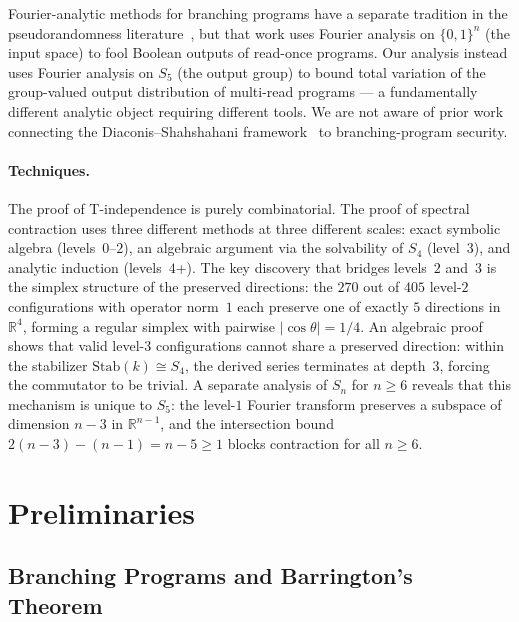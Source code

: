 \documentclass[11pt]{article}
\newcommand{\abs}[1]{\lvert #1 \rvert}
\begin{document}
Fourier-analytic methods for branching programs have a separate tradition
in the pseudorandomness literature~\cite{RSV13,LPV22}, but that
work uses Fourier analysis on $\{0,1\}^n$ (the input space) to fool
Boolean outputs of read-once programs.  Our analysis instead uses Fourier
analysis on $S_5$ (the output group) to bound total variation of the
group-valued output distribution of multi-read programs --- a fundamentally
different analytic object requiring different tools.  We are not aware of
prior work connecting the Diaconis--Shahshahani framework~\cite{DS81} to
branching-program security.

\paragraph{Techniques.}
The proof of T-independence is purely combinatorial. The proof of spectral
contraction uses three different methods at three different scales:
exact symbolic algebra (levels~$0$--$2$), an algebraic argument via
the solvability of $S_4$ (level~$3$), and analytic induction (levels~$4$+).
The key discovery that bridges levels~$2$ and~$3$ is the simplex structure of
the preserved directions: the $270$ out of $405$ level-$2$ configurations
with operator norm~$1$ each preserve one of exactly $5$ directions in
$\mathbb{R}^4$, forming a regular simplex with pairwise $\abs{\cos\theta} = 1/4$.
An algebraic proof shows that valid level-$3$ configurations cannot share a
preserved direction: within the stabilizer $\mathrm{Stab}(k) \cong S_4$,
the derived series terminates at depth~$3$, forcing the commutator to be
trivial. A separate analysis of $S_n$ for $n \geq 6$ reveals that this mechanism
is unique to $S_5$: the level-$1$ Fourier transform preserves a subspace of
dimension $n-3$ in $\mathbb{R}^{n-1}$, and the intersection bound
$2(n-3)-(n-1) = n-5 \geq 1$ blocks contraction for all $n \geq 6$.


\section{Preliminaries}
\label{sec:prelim}

\subsection{Branching Programs and Barrington's Theorem}
\end{document}
